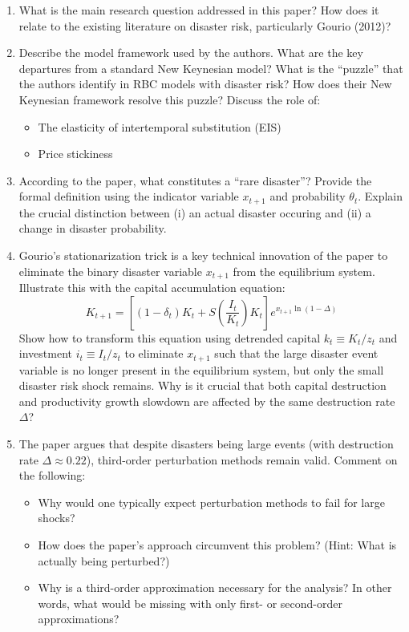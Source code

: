 \documentclass{article}
\numberwithin{equation}{section}
\begin{document}
\begin{enumerate}
\item What is the main research question addressed in this paper?
How does it relate to the existing literature on disaster risk, particularly Gourio (2012)?

\item Describe the model framework used by the authors.
What are the key departures from a standard New Keynesian model?
What is the ``puzzle'' that the authors identify in RBC models with disaster risk?
How does their New Keynesian framework resolve this puzzle?
Discuss the role of:
\begin{itemize}
\item The elasticity of intertemporal substitution (EIS)
\item Price stickiness
\end{itemize}

\item According to the paper, what constitutes a ``rare disaster''?
Provide the formal definition using the indicator variable \(x_{t+1}\) and probability \(\theta_t\).
Explain the crucial distinction between (i) an actual disaster occuring and (ii) a change in disaster probability.

\item Gourio's stationarization trick is a key technical innovation of the paper
  to eliminate the binary disaster variable \(x_{t+1}\) from the equilibrium system.
Illustrate this with the capital accumulation equation:
\begin{equation*}
K_{t+1} = \left[(1-\delta_t)K_t + S\left(\frac{I_t}{K_t}\right)K_t\right]e^{x_{t+1}\ln(1-\Delta)}
\end{equation*}
Show how to transform this equation using detrended capital \(k_t \equiv K_t/z_t\)
  and investment \(i_t \equiv I_t/z_t\) to eliminate \(x_{t+1}\)
  such that the large disaster event variable is no longer present in the equilibrium system,
  but only the small disaster risk shock remains.
Why is it crucial that both capital destruction and productivity growth slowdown are affected by the same destruction rate \(\Delta \)?

\item The paper argues that despite disasters being large events (with destruction rate \(\Delta \approx 0.22\)),
  third-order perturbation methods remain valid.
Comment on the following:
  \begin{itemize}
  \item Why would one typically expect perturbation methods to fail for large shocks?
  \item How does the paper's approach circumvent this problem? (Hint: What is actually being perturbed?)
  \item Why is a third-order approximation necessary for the analysis?
  In other words, what would be missing with only first- or second-order approximations?
  \end{itemize}

\end{enumerate}
\end{document}
